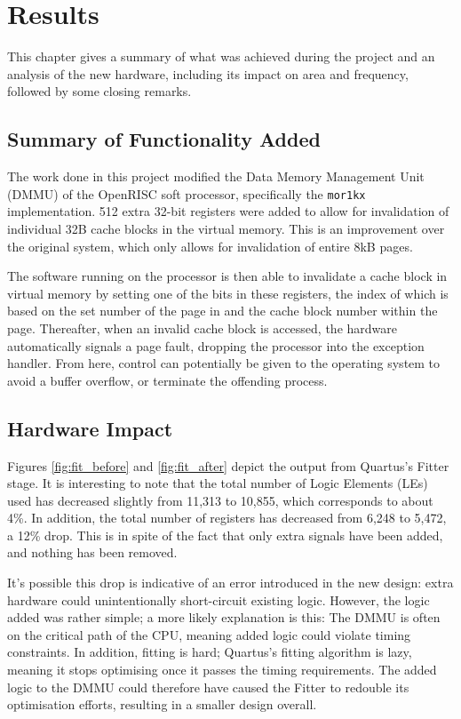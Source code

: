 \chapter{Results}
\label{cha:results}
This chapter gives a summary of what was achieved during the project and an analysis of the new hardware, including its impact on area and frequency, followed by some closing remarks.

\section{Summary of Functionality Added}
The work done in this project modified the Data Memory Management Unit (DMMU) of the OpenRISC soft processor, specifically the \texttt{mor1kx} implementation.
512 extra 32-bit registers were added to allow for invalidation of individual 32B cache blocks in the virtual memory. This is an improvement over the original system, which only allows for invalidation of entire 8kB pages.

The software running on the processor is then able to invalidate a cache block in virtual memory by setting one of the bits in these registers, the index of which is based on the set number of the page in and the cache block number within the page.
Thereafter, when an invalid cache block is accessed, the hardware automatically signals a page fault, dropping the processor into the exception handler. From here, control can potentially be given to the operating system to avoid a buffer overflow, or terminate the offending process.

\section{Hardware Impact}
Figures \ref{fig:fit_before} and \ref{fig:fit_after} depict the output from Quartus's Fitter stage. It is interesting to note that the total number of Logic Elements (LEs) used has decreased slightly from 11,313 to 10,855, which corresponds to about 4\%. In addition, the total number of registers has decreased from 6,248 to 5,472, a 12\% drop. This is in spite of the fact that only extra signals have been added, and nothing has been removed.

It's possible this drop is indicative of an error introduced in the new design: extra hardware could unintentionally short-circuit existing logic. However, the logic added was rather simple; a more likely explanation is this: The DMMU is often on the critical path of the CPU, meaning added logic could violate timing constraints. In addition, fitting is hard; Quartus's fitting algorithm is lazy, meaning it stops optimising once it passes the timing requirements. The added logic to the DMMU could therefore have caused the Fitter to redouble its optimisation efforts, resulting in a smaller design overall.

